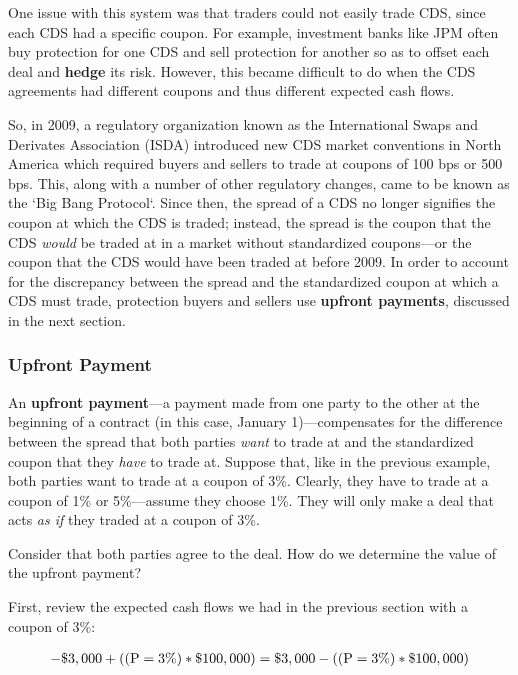 \documentclass[article]{jss}
\begin{document}
One issue with this system was that traders could not easily trade CDS, since each CDS had a specific coupon.
For example, investment banks like JPM often buy protection for one CDS and sell protection for another so as to offset each deal and \textbf{hedge} its risk. However, this became difficult to do when the CDS agreements had different coupons and thus different expected cash flows.

So, in 2009, a regulatory organization known as the International Swaps and Derivates Association (ISDA) 
introduced new CDS market conventions in North America which required buyers and sellers to trade at coupons of 100 bps or 500 bps. This, along with a number of other regulatory changes, came to be known as the `Big Bang Protocol`. Since then, the spread of a CDS no longer signifies the coupon at which the CDS is traded; instead, the spread is the coupon that the CDS \emph{would} be traded at in a market without standardized coupons---or the coupon that the CDS would have been traded at before 2009. In order to account for the discrepancy between the spread and the standardized coupon at which a CDS must trade, protection buyers and sellers use \textbf{upfront payments}, discussed in the next section.

\subsubsection{Upfront Payment}
\label{sec:Upfront}

An \textbf{upfront payment}---a payment made from one party to the other at the beginning of a contract (in this case, January 1)---compensates for the difference between the spread that both parties \emph{want} to trade at and the standardized coupon that they \emph{have} to trade at. Suppose that, like in the previous example, both parties want to trade at a coupon of 3\%. Clearly, they have to trade at a coupon of 1\% or 5\%---assume they choose 1\%. They will only make a deal that acts \emph{as if} they traded at a coupon of 3\%. 

Consider that both parties agree to the deal. How do we determine the value of the upfront payment?

First, review the expected cash flows we had in the previous section with a coupon of 3\%:

\begin{equation}
 \begin{aligned}
   {\rm - \$3,000 + ((P = 3\%) * \$100,000) = \$3,000 - ((P = 3\%) * \$100,000)}
    \end{aligned}
\end{equation}
\end{document}
